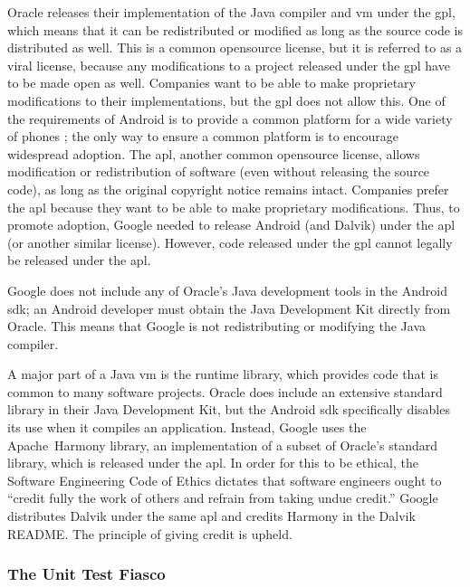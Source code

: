 \documentclass[11pt]{article}
\begin{document}
\begin{multicols}{2}
Oracle releases their implementation of the Java compiler and \gls{vm} under the
\gls{gpl}, which means that it can be redistributed or modified as long as the
source code is distributed as well.  This is a common \gls{opensource} license,
but it is referred to as a viral license, because any modifications to a project
released under the \gls{gpl} have to be made open as well.
\cite[\S5]{gpl-license} Companies want to be able to make proprietary
modifications to their implementations, but the \gls{gpl} does not allow this.
One of the requirements of Android is to provide a common platform for a wide
variety of phones \cite{open-handset-alliance-ann}; the only way to ensure a
common platform is to encourage widespread adoption.  The \gls{apl}, another
common \gls{opensource} license, allows modification or redistribution of
software (even without releasing the source code), as long as the original
copyright notice remains intact. \cite{apache-license} Companies prefer the
\gls{apl} because they want to be able to make proprietary modifications.
\cite{why-apache2-license} Thus, to promote adoption, Google needed to release
Android (and Dalvik) under the \gls{apl} (or another similar license).  However,
code released under the \gls{gpl} cannot legally be released under the
\gls{apl}.

Google does not include any of Oracle's Java development tools in the Android
\gls{sdk}; an Android developer must obtain the Java Development Kit directly
from Oracle.  This means that Google is not redistributing or modifying the Java
compiler.

A major part of a Java \gls{vm} is the runtime \gls{library}, which provides
code that is common to many software projects.  Oracle does include an extensive
standard \gls{library} in their Java Development Kit, but the Android \gls{sdk}
specifically disables its use when it compiles an application.  Instead, Google
uses the Apache~Harmony \gls{library}, an implementation of a subset of Oracle's
standard \gls{library}, which is released under the \gls{apl}.  In order for
this to be ethical, the Software Engineering Code of Ethics dictates that
software engineers ought to ``credit fully the work of others and refrain from
taking undue credit.'' \cite[\S 7.03]{secode}  Google distributes Dalvik under
the same \gls{apl} and credits Harmony in the Dalvik README.
\cite{dalvik-readme}  The principle of giving credit is upheld.

\subsubsection{The Unit Test Fiasco} %
\label{ssub:unittest-fiasco}


\end{multicols}
\end{document}
